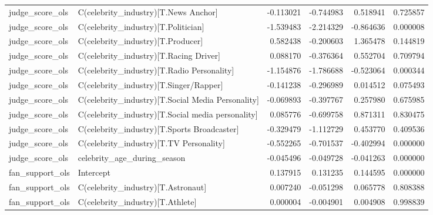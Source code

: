 \begin{table}
\begin{tabular}{llrrrr}
judge\_score\_ols & C(celebrity\_industry)[T.News Anchor] & -0.113021 & -0.744983 & 0.518941 & 0.725857 \\
judge\_score\_ols & C(celebrity\_industry)[T.Politician] & -1.539483 & -2.214329 & -0.864636 & 0.000008 \\
judge\_score\_ols & C(celebrity\_industry)[T.Producer] & 0.582438 & -0.200603 & 1.365478 & 0.144819 \\
judge\_score\_ols & C(celebrity\_industry)[T.Racing Driver] & 0.088170 & -0.376364 & 0.552704 & 0.709794 \\
judge\_score\_ols & C(celebrity\_industry)[T.Radio Personality] & -1.154876 & -1.786688 & -0.523064 & 0.000344 \\
judge\_score\_ols & C(celebrity\_industry)[T.Singer/Rapper] & -0.141238 & -0.296989 & 0.014512 & 0.075493 \\
judge\_score\_ols & C(celebrity\_industry)[T.Social Media Personality] & -0.069893 & -0.397767 & 0.257980 & 0.675985 \\
judge\_score\_ols & C(celebrity\_industry)[T.Social media personality] & 0.085776 & -0.699758 & 0.871311 & 0.830475 \\
judge\_score\_ols & C(celebrity\_industry)[T.Sports Broadcaster] & -0.329479 & -1.112729 & 0.453770 & 0.409536 \\
judge\_score\_ols & C(celebrity\_industry)[T.TV Personality] & -0.552265 & -0.701537 & -0.402994 & 0.000000 \\
judge\_score\_ols & celebrity\_age\_during\_season & -0.045496 & -0.049728 & -0.041263 & 0.000000 \\
fan\_support\_ols & Intercept & 0.137915 & 0.131235 & 0.144595 & 0.000000 \\
fan\_support\_ols & C(celebrity\_industry)[T.Astronaut] & 0.007240 & -0.051298 & 0.065778 & 0.808388 \\
fan\_support\_ols & C(celebrity\_industry)[T.Athlete] & 0.000004 & -0.004901 & 0.004908 & 0.998839 \\
\bottomrule
\end{tabular}
\end{table}
